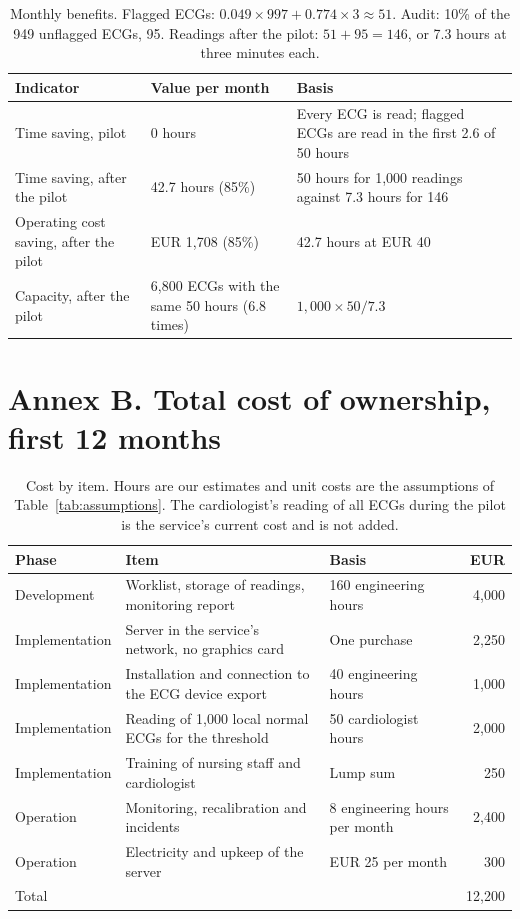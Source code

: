 \documentclass[letterpaper,11pt]{article}
\begin{document}
\begin{table}[H]
  \centering
  \caption{Monthly benefits. Flagged ECGs: $0.049 \times 997 + 0.774 \times 3 \approx 51$. Audit: 10\% of the 949 unflagged ECGs, 95. Readings after the pilot: $51 + 95 = 146$, or 7.3 hours at three minutes each.}
  \label{tab:benefits}
  \small
  \begin{tabular}{p{4.3cm}p{3.6cm}p{7.1cm}}
    \toprule
    Indicator & Value per month & Basis \\
    \midrule
    Time saving, pilot & 0 hours & Every ECG is read; flagged ECGs are read in the first 2.6 of 50 hours \\
    Time saving, after the pilot & 42.7 hours (85\%) & 50 hours for 1,000 readings against 7.3 hours for 146 \\
    Operating cost saving, after the pilot & EUR 1,708 (85\%) & 42.7 hours at EUR 40 \\
    Capacity, after the pilot & 6,800 ECGs with the same 50 hours (6.8 times) & $1{,}000 \times 50 / 7.3$ \\
    \bottomrule
  \end{tabular}
\end{table}

\section*{Annex B. Total cost of ownership, first 12 months}

\begin{table}[H]
  \centering
  \caption{Cost by item. Hours are our estimates and unit costs are the assumptions of Table~\ref{tab:assumptions}. The cardiologist's reading of all ECGs during the pilot is the service's current cost and is not added.}
  \label{tab:tco}
  \small
  \begin{tabular}{p{2.6cm}p{6.2cm}p{3.6cm}r}
    \toprule
    Phase & Item & Basis & EUR \\
    \midrule
    Development & Worklist, storage of readings, monitoring report & 160 engineering hours & 4,000 \\
    Implementation & Server in the service's network, no graphics card & One purchase & 2,250 \\
    Implementation & Installation and connection to the ECG device export & 40 engineering hours & 1,000 \\
    Implementation & Reading of 1,000 local normal ECGs for the threshold & 50 cardiologist hours & 2,000 \\
    Implementation & Training of nursing staff and cardiologist & Lump sum & 250 \\
    Operation & Monitoring, recalibration and incidents & 8 engineering hours per month & 2,400 \\
    Operation & Electricity and upkeep of the server & EUR 25 per month & 300 \\
    \midrule
    Total & & & 12,200 \\
    \bottomrule
  \end{tabular}
\end{table}
\end{document}
